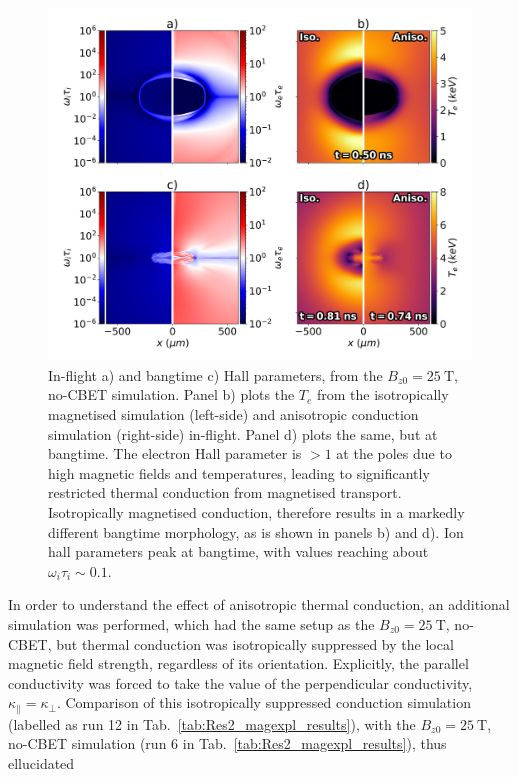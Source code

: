 \begin{figure}[t!]
    \includegraphics[width=0.8\linewidth]{Results2/Images/iso_aniso.png}
    \centering
    \caption{In-flight a) and bangtime c) Hall parameters, from the $B_{z0}=25\ \text{T}$, no-\ac{CBET} simulation.
    Panel b) plots the $T_e$ from the isotropically magnetised simulation (left-side) and anisotropic conduction simulation (right-side) in-flight.
    Panel d) plots the same, but at bangtime.
    The electron Hall parameter is $>1$ at the poles due to high magnetic fields and temperatures, leading to significantly restricted thermal conduction from magnetised transport.
    Isotropically magnetised conduction, therefore results in a markedly different bangtime morphology, as is shown in panels b) and d).
    Ion hall parameters peak at bangtime, with values reaching about $\omega_i\tau_i\sim0.1$.}%
    \label{fig:Res2_iso_aniso}
\end{figure}

In order to understand the effect of anisotropic thermal conduction, an additional simulation was performed, which had the same setup as the $B_{z0}=25\ \text{T}$, no-\ac{CBET}, but thermal conduction was isotropically suppressed by the local magnetic field strength, regardless of its orientation.
Explicitly, the parallel conductivity was forced to take the value of the perpendicular conductivity, $\kappa_{\parallel}=\kappa_{\perp}$.
Comparison of this isotropically suppressed conduction simulation (labelled as run 12 in Tab.~\ref{tab:Res2_magexpl_results}), with the $B_{z0}=25\ \text{T}$, no-\ac{CBET} simulation (run 6 in Tab.~\ref{tab:Res2_magexpl_results}), thus ellucidated 

